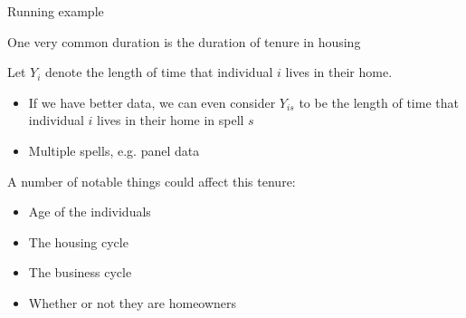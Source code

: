 \documentclass[notes,11pt, aspectratio=169]{beamer}
\newenvironment{wideitemize}{\itemize\addtolength{\itemsep}{10pt}}{\enditemize}
\begin{document}
\begin{frame}{Running example}
  \begin{wideitemize}
  \item One very common duration is the duration of tenure in housing
  \item Let $Y_{i}$ denote the length of time that individual $i$ lives in their home.
    \begin{itemize}
    \item If we have better data, we can even consider $Y_{is}$ to be the length of time that individual $i$ lives in their home in spell $s$
    \item Multiple spells, e.g. panel data
    \end{itemize}
  \item A number of notable things could affect this tenure:
    \begin{itemize}
    \item Age of the individuals
    \item The housing cycle
    \item The business cycle
    \item Whether or not they are homeowners
    \end{itemize}
  \end{wideitemize}
\end{frame}
\end{document}
